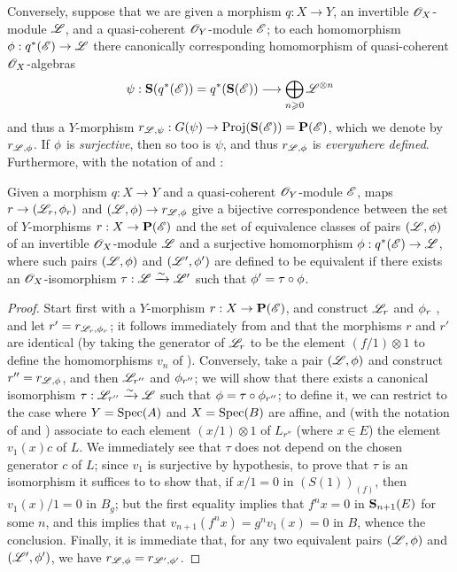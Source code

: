 \begin{env}[4.2.2]
\label{II.4.2.2}
Conversely, suppose that we are given a morphism $q:X\to Y$, an invertible $\mathscr{O}_X$-module $\mathscr{L}$, and a quasi-coherent $\mathscr{O}_Y$-module $\mathscr{E}$;
to each homomorphism $\vphi:q^*(\sh{E})\to\sh{L}$ there canonically corresponding homomorphism of quasi-coherent $\mathscr{O}_X$-algebras
\[
  \psi: \bb{S}(q^*(\sh{E})) = q^*(\bb{S}(\sh{E})) \to \bigoplus_{n\geq0}\sh{L}^{\otimes n}
\]
and thus  a $Y$-morphism $r_{\sh{L},\psi}:G(\psi)\to\Proj(\bb{S}(\sh{E}))=\bb{P}(\sh{E})$, which we denote by $r_{\mathscr{L},\phi}$.
If $\phi$ is \emph{surjective}, then so too is $\psi$, and thus  $r_{\mathscr{L},\phi}$ is \emph{everywhere defined}.
Furthermore, with the notation of  and :
\end{env}

\begin{proposition}[4.2.3]
\label{II.4.2.3}
Given a morphism $q:X\to Y$ and a quasi-coherent $\mathscr{O}_Y$-module $\mathscr{E}$, maps $r\to(\sh{L}_r,\vphi_r)$ and $(\sh{L},\vphi)\to r_{\sh{L},\vphi}$ give a bijective correspondence between the set of $Y$-morphisms $r:X\to\bb{P}(\sh{E})$ and the set of equivalence classes of pairs $(\mathscr{L},\phi)$ of an invertible $\mathscr{O}_X$-module $\mathscr{L}$ and a surjective homomorphism $\vphi:q^*(\sh{E})\to\sh{L}$, where such pairs $(\mathscr{L},\phi)$ and $(\mathscr{L}',\phi')$ are defined to be equivalent if there exists an $\mathscr{O}_X$-isomorphism $\tau:\mathscr{L}\xrightarrow{\sim}\mathscr{L}'$ such that $\phi'=\tau\circ\phi$.
\end{proposition}

\begin{proof}
Start first with a $Y$-morphism $r:X\to\bb{P}(\sh{E})$, and construct $\mathscr{L}_r$ and $\phi_r$ , and let $r'=r_{\mathscr{L}_r,\phi_r}$;
it follows immediately from  and  that the morphisms $r$ and $r'$ are identical (by taking the generator of $\mathscr{L}_r$ to be the element $(f/1)\otimes1$ to define the homomorphisms $v_n$ of ).
Conversely, take a pair $(\mathscr{L},\phi)$ and construct
$r''=r_{\mathscr{L},\phi}$, and then $\mathscr{L}_{r''}$ and $\phi_{r''}$;
we will show that there exists a canonical isomorphism $\tau:\mathscr{L}_{r''}\xrightarrow{\sim}\mathscr{L}$ such that $\phi=\tau\circ\phi_{r''}$;
to define it, we can restrict to the case where $Y=\operatorname{Spec}(A)$ and $X=\operatorname{Spec}(B)$ are affine, and (with the notation of  and ) associate to each element $(x/1)\otimes1$ of $L_{r''}$ (where $x\in E$) the element $v_1(x)c$ of $L$.
We immediately see that $\tau$ does not depend on the chosen generator $c$ of $L$;
since $v_1$ is surjective by hypothesis, to prove that $\tau$ is an isomorphism it suffices to to show that, if $x/1=0$ in $(S(1))_{(f)}$, then $v_1(x)/1=0$ in $B_g$;
but the first equality implies that $f^nx=0$ in $\mathbf{S}_{n+1}(E)$ for some $n$, and this implies that $v_{n+1}(f^nx) = g^nv_1(x) = 0$ in $B$, whence the conclusion.
Finally, it is immediate that, for any two equivalent pairs $(\mathscr{L},\phi)$ and $(\mathscr{L}',\phi')$, we have $r_{\mathscr{L},\phi}=r_{\mathscr{L}',\phi'}$.
\end{proof}

